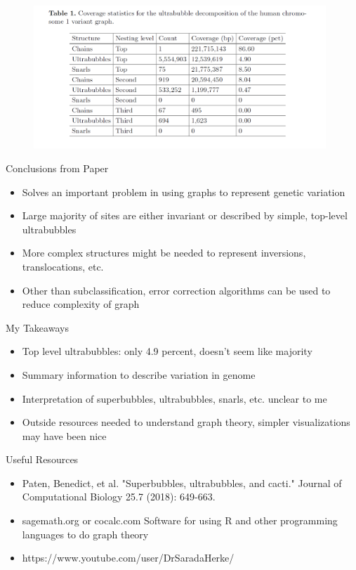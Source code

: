\documentclass{beamer}
\begin{document}
\begin{frame}
\begin{figure}[H]
\centering
\includegraphics[width=110mm]{TableChr1.png}
\end{figure}
\end{frame}
\begin{frame}{Conclusions from Paper}
    \begin{itemize}
        \item Solves an important problem in using graphs to represent genetic variation
        \item Large majority of sites are either invariant or described by simple, top-level ultrabubbles
        \item More complex structures might be needed to represent inversions, translocations, etc.
        \item Other than subclassification, error correction algorithms can be used to reduce complexity of graph
    \end{itemize}
\end{frame}
\begin{frame}{My Takeaways}
    \begin{itemize}
        \item Top level ultrabubbles: only 4.9 percent, doesn't seem like majority
        \item Summary information to describe variation in genome 
        \item Interpretation of superbubbles, ultrabubbles, snarls, etc. unclear to me
        \item Outside resources needed to understand graph theory, simpler visualizations may have been nice
    \end{itemize}
\end{frame}

\begin{frame}{Useful Resources}
\begin{itemize}
    \item Paten, Benedict, et al. "Superbubbles, ultrabubbles, and cacti." Journal of Computational Biology 25.7 (2018): 649-663.
    \item sagemath.org or cocalc.com Software for using R and other programming languages to do graph theory
    \item https://www.youtube.com/user/DrSaradaHerke/

\end{itemize}
    
\end{frame}
\end{document}
